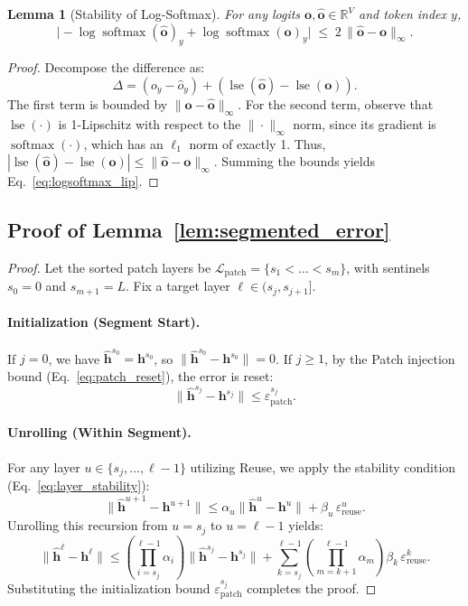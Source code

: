 \documentclass{article}
\theoremstyle{plain}
\newtheorem{lemma}[theorem]{Lemma}
\theoremstyle{definition}
\theoremstyle{remark}
\begin{document}
\begin{lemma}[Stability of Log-Softmax]
\label{lem:logsoftmax_lip}
For any logits $\mathbf{o}, \hat{\mathbf{o}} \in \mathbb{R}^V$ and token index $y$,
\begin{equation}
\big| -\log\operatorname{softmax}(\hat{\mathbf{o}})_y + \log\operatorname{softmax}(\mathbf{o})_y \big|
\;\le\;
2 \, \| \hat{\mathbf{o}} - \mathbf{o} \|_\infty.
\label{eq:logsoftmax_lip}
\end{equation}
\end{lemma}
\begin{proof}
Decompose the difference as:
\[
\Delta = (o_y - \hat{o}_y) + (\operatorname{lse}(\hat{\mathbf{o}}) - \operatorname{lse}(\mathbf{o})).
\]
The first term is bounded by $\| \mathbf{o} - \hat{\mathbf{o}} \|_\infty$.
For the second term, observe that $\operatorname{lse}(\cdot)$ is 1-Lipschitz with respect to the $\|\cdot\|_\infty$ norm, since its gradient is $\operatorname{softmax}(\cdot)$, which has an $\ell_1$ norm of exactly 1. Thus,
\(
| \operatorname{lse}(\hat{\mathbf{o}}) - \operatorname{lse}(\mathbf{o}) | \le \| \hat{\mathbf{o}} - \mathbf{o} \|_\infty.
\)
Summing the bounds yields Eq.~\eqref{eq:logsoftmax_lip}.
\end{proof}

\subsection{Proof of Lemma~\ref{lem:segmented_error}}

\begin{proof}
Let the sorted patch layers be $\mathcal{L}_{\mathrm{patch}} = \{s_1 < \dots < s_m\}$, with sentinels $s_0 = 0$ and $s_{m+1} = L$.
Fix a target layer $\ell \in (s_j, s_{j+1}]$.

\paragraph{Initialization (Segment Start).}
If $j=0$, we have $\hat{\mathbf{h}}^{s_0} = \mathbf{h}^{s_0}$, so $\|\hat{\mathbf{h}}^{s_0} - \mathbf{h}^{s_0}\| = 0$.
If $j \ge 1$, by the Patch injection bound (Eq.~\eqref{eq:patch_reset}), the error is reset:
\[
\| \hat{\mathbf{h}}^{s_j} - \mathbf{h}^{s_j} \| \le \varepsilon_{\mathrm{patch}}^{s_j}.
\]

\paragraph{Unrolling (Within Segment).}
For any layer $u \in \{s_j, \dots, \ell-1\}$ utilizing Reuse, we apply the stability condition (Eq.~\eqref{eq:layer_stability}):
\[
\| \hat{\mathbf{h}}^{u+1} - \mathbf{h}^{u+1} \|
\le \alpha_u \| \hat{\mathbf{h}}^{u} - \mathbf{h}^{u} \| + \beta_u \, \varepsilon_{\mathrm{reuse}}^{u}.
\]
Unrolling this recursion from $u = s_j$ to $u = \ell-1$ yields:
\[
\| \hat{\mathbf{h}}^{\ell} - \mathbf{h}^{\ell} \|
\le
\left( \prod_{i=s_j}^{\ell-1} \alpha_i \right) \| \hat{\mathbf{h}}^{s_j} - \mathbf{h}^{s_j} \|
+
\sum_{k=s_j}^{\ell-1} \left( \prod_{m=k+1}^{\ell-1} \alpha_m \right) \beta_k \, \varepsilon_{\mathrm{reuse}}^{k}.
\]
Substituting the initialization bound $\varepsilon_{\mathrm{patch}}^{s_j}$ completes the proof.
\end{proof}
\end{document}
